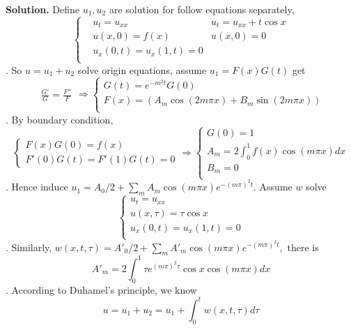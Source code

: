 \documentclass[a4paper]{book}
\newenvironment{solution}%
{\noindent\textbf{Solution.}}%
{\qedhere}
\numberwithin{equation}{chapter}
\theoremstyle{definition}
\begin{document}
\begin{solution}
    Define $u_1, u_2$ are solution for follow equations separately,
    \begin{equation*}
        \left\{ \begin{aligned}
             & u_t = u_{xx} \qquad \qquad \qquad & u_t = u_{xx} + t \cos x \\
             & u(x, 0) = f(x)                    & u(x, 0) = 0             \\
             & u_x(0, t) = u_x(1, t) = 0                                   \\
        \end{aligned}
        \right.
    \end{equation*}.
    So $u = u_1 +u_2$ solve origin equations, assume $u_1 = F(x)G(t)$ get
    \begin{equation*}
        \begin{array}{l}
            \frac{G'}{G} = \frac{F''}{F}
        \end{array}
        \Rightarrow
        \left\{ \begin{array}{l}
            G(t) = e^{-m^2t} G(0)                                             \\
            F(x) = (A_m \cos(2m \pi x) + B_m \sin(2m \pi x)) \\
        \end{array}
        \right.
    \end{equation*}.
    By boundary condition,
    \begin{equation*}
        \left\{
        \begin{array}{l}
            F(x)G(0) = f(x) \\
            F'(0)G(t) = F'(1)G(t) = 0
        \end{array}
        \right.
        \Rightarrow
        \left\{
        \begin{array}{l}
            G(0) = 1                               \\
            A_m = 2\int_0^1 f(x) \cos( m \pi x) dx \\
            B_m = 0                                \\
        \end{array}
        \right.
    \end{equation*}.
    Hence induce $u_1 = A_0/2 + \sum_m A_m \cos(m\pi x)e^{-(m\pi)^2 t}$. Assume
    $w$ solve
    \begin{equation*}
        \left\{
        \begin{array}{l}
            u_t = u_{xx}              \\
            u(x, \tau) = \tau \cos x        \\
            u_x(0, t) = u_x(1, t) = 0 \\
        \end{array}
        \right.
    \end{equation*}.
    Similarly, $w(x, t, \tau) = A'_0/2 + \sum_m  A'_m \cos(m\pi x)e^{-(m\pi)^2 t}, $ there is
    \[ A'_m = 2\int_0^1 \tau e^{(m\pi)^2 \tau} \cos x \cos(m \pi x) dx\].
    According to Duhamel's principle, we know 
    \[ u = u_1 + u_2 = u_1 + \int_0^t w(x, t, \tau) d\tau  \]
\end{solution}
\end{document}
